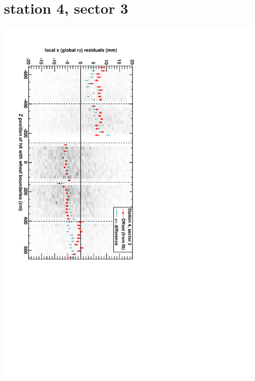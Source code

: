 \documentclass[compress]{beamer}
\begin{document}
\section*{station 4, sector 3}
\begin{frame} \vfill \mbox{\hspace{-1 cm}\includegraphics[height=1.2\linewidth, angle=90]{DTrphiVsZ_st4_sr03.pdf}} \end{frame}
\end{document}
